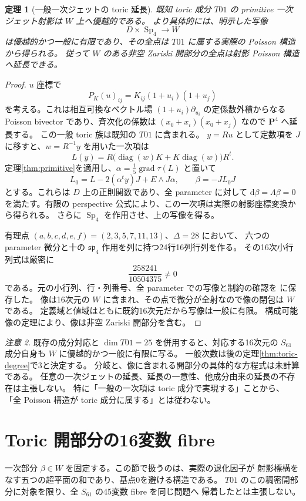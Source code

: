 \documentclass[11pt,a4paper]{ltjsarticle}
\newcommand{\PP}{\mathbf P}
\newcommand{\dd}{\mathrm d}
\DeclareMathOperator{\Sp}{Sp}
\DeclareMathOperator{\grad}{grad}
\newtheorem{theorem}{定理}[section]
\theoremstyle{remark}
\newtheorem{remark}[theorem]{注意}
\begin{document}
\begin{theorem}[一般一次ジェットの toric 延長]\label{thm:toric-dominance}
既知 toric 成分 $T01$ の primitive 一次ジェット射影は $W$ 上へ優越的である。
より具体的には、明示した写像
\[
 D\times\Sp_4\longrightarrow W
\]
は優越的かつ一般に有限であり、その全点は $T01$ に属する実際の Poisson 構造から得られる。
従って $W$ のある非空 Zariski 開部分の全点は射影 Poisson 構造へ延長できる。
\end{theorem}
\begin{proof}
$u$ 座標で
\[
 P_K(u)_{ij}=K_{ij}(1+u_i)(1+u_j)
\]
を考える。これは相互可換なベクトル場 $(1+u_i)\partial_{u_i}$ の定係数外積からなる
Poisson bivector であり、斉次化の係数は $(x_0+x_i)(x_0+x_j)$ なので $\PP^4$ へ延長する。
この一般 toric 族は既知の $T01$ に含まれる。
$y=Ru$ として定数項を $J$ に移すと、$w=R^{-1}y$ を用いた一次項は
\[
 L(y)=R\bigl(\operatorname{diag}(w)K+
                 K\operatorname{diag}(w)\bigr)R^t.
\]
定理\ref{thm:primitive}を適用し、$\alpha=\frac15\grad\tau(L)$ と置いて
\[
 L_0=L-2(\alpha^t y)J+E\wedge J\alpha,\qquad\beta=-JL_0J
\]
とする。これらは $D$ 上の正則関数であり、全 parameter に対して
$\dd\beta=\Lambda\beta=0$ を満たす。有限の perspective 公式により、この一次項は実際の射影座標変換から得られる。
さらに $\Sp_4$ を作用させ、上の写像を得る。

有理点 $(a,b,c,d,e,f)=(2,3,5,7,11,13)$、$\Delta=28$ において、
六つの parameter 微分と十の $\mathfrak{sp}_4$ 作用を列に持つ24行16列行列を作る。
その16次小行列式は厳密に
\[
 \frac{258241}{10504375}\ne0
\]
である。元の小行列、行・列番号、全 parameter での写像と制約の確認を
\cite{toric-certificate}に保存した。
像は16次元の $W$ に含まれ、その点で微分が全射なので像の閉包は $W$ である。
定義域と値域はともに既約16次元だから写像は一般に有限。
構成可能像の定理により、像は非空 Zariski 開部分を含む。
\end{proof}

\begin{remark}
既存の成分対応と $\dim T01=25$ を併用すると、対応する16次元の $S_{61}$ 成分自身も
$W$ に優越的かつ一般に有限に写る。
一般次数は後の定理\ref{thm:toric-degree}で3と決定する。
分岐と、像に含まれる開部分の具体的な方程式は未計算である。
任意の一次ジェットの延長、延長の一意性、他成分由来の延長の不存在は主張しない。
特に「一般の一次項は toric 成分で実現する」ことから、
「全 Poisson 構造が toric 成分に属する」とは従わない。
\end{remark}

\section{Toric 開部分の16変数 fibre}\label{sec:coframe}
一次部分 $\beta\in W$ を固定する。この節で扱うのは、実際の退化因子が
射影標構をなす五つの超平面の和であり、基点0を避ける構造である。
$T01$ のこの稠密開部分に対象を限り、全 $S_{61}$ の45変数 fibre を同じ問題へ
帰着したとは主張しない。
\end{document}
